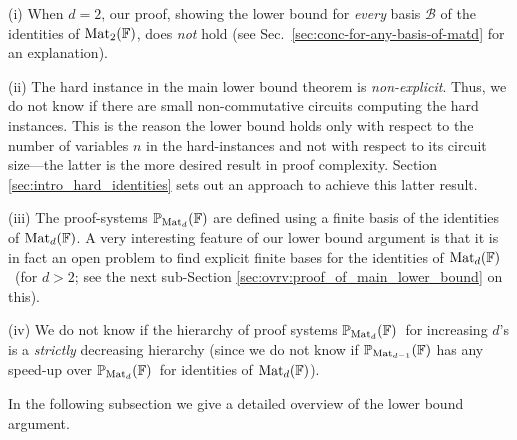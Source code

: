 \documentclass[12pt,reqno]{article}
\newtheorem*{theorem*}{Theorem}
\newcommand\F{\ensuremath{\mathbb F}}
\newcommand\PP{{\mathbb P}}
\newcommand\PMd{\ensuremath{\PP_{{\rm Mat}_d}(\F)}}
\newcommand {\ind} {\noindent}
\newcommand{\matd}{{\ensuremath{{\rm Mat}_d(\F)}}}
\newcommand{\mattwo}{{\ensuremath{{\rm Mat}_2(\F)}}}
\newcommand{\freea}{\ensuremath{\F\langle X\rangle}}
\begin{document}
(i) When $d=2$, our proof, showing the lower bound for
\textit{every} basis \(\mathcal B\) of the identities of \mattwo, does \textit{not} hold (see Sec.~\ref{sec:conc-for-any-basis-of-matd} for an explanation).

(ii) The hard instance in the main lower bound theorem is \textit{non-explicit}.
Thus, we do not know if there are small non-commutative circuits computing the hard instances. This is the reason the lower bound holds only with respect to the number of variables $n$ in the hard-instances and not with respect to its circuit size---the latter is the more desired result in proof complexity.
Section \ref{sec:intro_hard_identities} sets out an approach to achieve this latter result.

(iii) The proof-systems ${\PP_{{\rm Mat}_d}(\F)}$
are defined using a finite basis of the identities of \matd. A very interesting feature of our lower bound argument is that it is in fact an open problem to find explicit finite
bases for the identities of \matd\ (for $d>2$; see the next sub-Section \ref{sec:ovrv:proof_of_main_lower_bound} on this).

(iv) We do not know if the hierarchy of proof systems \PMd\ for increasing $d$'s is a \emph{strictly} decreasing hierarchy (since we do not know if $\PP_{{\rm Mat}_{d-1}}(\F)$ has any speed-up over \PMd\  for identities of \matd).
\medskip



In the following subsection we give a detailed overview of the lower bound argument.



%
%
%
\end{document}
